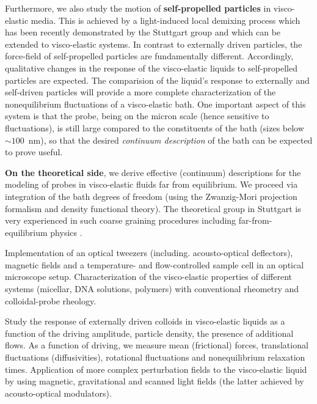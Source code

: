 \begin{workpackage}
\begin{mdframed}
Furthermore, we also study the motion of {\bf self-propelled particles} in visco-elastic media. This is achieved by a light-induced local demixing process which has been recently demonstrated by the Stuttgart group \cite{kuemmel2013, buttinoni2013, tenHagen2014} and which can be extended to visco-elastic systems. In contrast to externally driven particles, the force-field of self-propelled particles are fundamentally different. Accordingly, qualitative changes in the response of the visco-elastic liquids to self-propelled particles are expected. The comparision of the liquid's response to externally and self-driven particles will provide a more complete characterization of the
nonequilibrium fluctuations of a visco-elastic bath. One important aspect of this system is that the
probe, being on the micron scale (hence sensitive to fluctuations), is still large compared
to the constituents of the bath (sizes below $\sim 100$~nm), so that the desired {\it
  continuum description} of the bath can be expected to prove useful.

{\bf On the theoretical side}, we derive effective (continuum) descriptions for the
modeling of probes in visco-elastic fluids far from equilibrium. We proceed via
integration of the bath degrees of freedom (using the Zwanzig-Mori projection formalism and
density functional theory).
%
The theoretical group in Stuttgart is very experienced in such coarse graining procedures
\cite{Aerov14} including far-from-equilibrium physics \cite{Kruger11,Kruger09}.


\printbibliography[heading=proposal-bib,env=proposal-env]

\end{mdframed}

\begin{tasklist}

\begin{task}[title=Experimental setup,id=brown-t1,PM=24,lead=USTUTT,wphases=0-24!0.5]
Implementation of an optical tweezers (including. acousto-optical deflectors), magnetic fields and a temperature- and flow-controlled sample cell in an optical microscope setup. Characterization of the visco-elastic properties of different systems (micellar, DNA solutions, polymers) with conventional rheometry and colloidal-probe rheology. 
\end{task}


\begin{task}[title=Externally driven particles in visco-elastic baths,id=brown-t2,PM=24,lead=USTUTT,wphases=0-24!0.5]
Study the response of externally driven colloids in visco-elastic liquids as a function of the driving amplitude, particle density, the presence of additional flows. As a function of driving, we
measure mean (frictional) forces, translational fluctuations (diffusivities), rotational
fluctuations and nonequilibrium relaxation times. Application of more complex perturbation fields to the visco-elastic liquid by using magnetic, gravitational and scanned light fields (the latter achieved by acousto-optical modulators).
\end{task}


\end{tasklist}
\end{workpackage}
